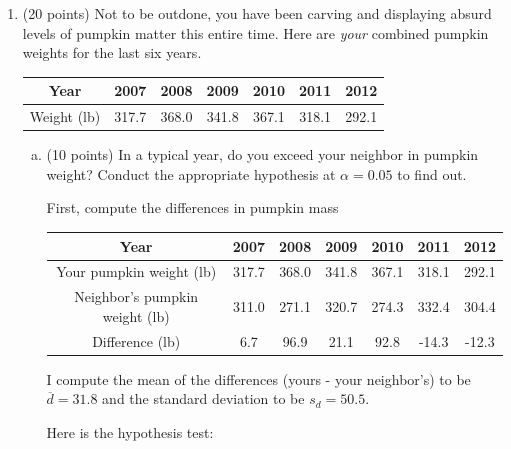 \documentclass{article}\usepackage{graphicx, color}
\providecommand{\ov}[1]{\overline{#1}}
\numberwithin{equation}{section}
\begin{document}
\begin{flushleft}
\begin{enumerate}[1. ]
\begin{enumerate}[a. ]
{With 99\% confidence, the true mean annual combined pumpkin weight exceeds 261.62 lb. That's TOO MUCH PUMPKIN MATTER for individual use. 
}

\end{enumerate}


\item (20 points) Not to be outdone, you have been carving and displaying absurd levels of pumpkin matter this entire time. Here are \emph{your} combined pumpkin weights for the last six years.

\begin{center}
\begin{tabular}{c|cccccc}
Year & 2007 & 2008 & 2009 & 2010 & 2011 & 2012 \\ \hline
Weight (lb) & 317.7 & 368.0 & 341.8 & 367.1 & 318.1 & 292.1   \\ 
\end{tabular}
\end{center}

\begin{enumerate}[a. ]
\item (10 points) In a typical year, do you exceed your neighbor in pumpkin weight? Conduct the appropriate hypothesis at $\alpha = 0.05$ to find out.

{\color{red}
First, compute the differences in pumpkin mass


\begin{center}
\begin{tabular}{c|cccccc}
Year & 2007 & 2008 & 2009 & 2010 & 2011 & 2012 \\ \hline
Your pumpkin weight (lb) & 317.7 & 368.0 & 341.8 & 367.1 & 318.1 & 292.1   \\ 
Neighbor's pumpkin weight (lb) & 311.0 & 271.1 & 320.7 & 274.3 & 332.4 & 304.4   \\ 
Difference (lb) & 6.7  & 96.9 & 21.1 & 92.8 & -14.3 & -12.3
\end{tabular}
\end{center}

I compute the mean of the differences (yours - your neighbor's) to be $\ov{d} = 31.8$ and the standard deviation to be $s_d = 50.5$.


Here is the hypothesis test:

}
\end{enumerate}
\end{enumerate}
\end{flushleft}
\end{document}
